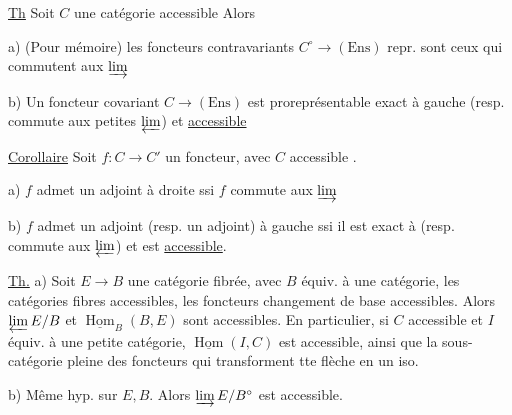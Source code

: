 \uline{Th} Soit $C$ une catégorie accessible   Alors

a) (Pour mémoire) les foncteurs contravariants $C^\circ\to(\mathrm{Ens})$ repr. sont ceux qui commutent aux  $\varinjlim$\deleted{\unsure{---}}


b) Un foncteur covariant  $C\to(\mathrm{Ens})$ est proreprésentable    exact à gauche (resp. commute aux petites $\varprojlim$) et \uline{accessible}

\uline{Corollaire} Soit $f:C\to C'$ un foncteur, avec $C$ accessible .

a) $f$ admet un adjoint à droite ssi $f$ commute aux  $\varinjlim$

b) $f$ admet un adjoint  (resp. un adjoint) à gauche ssi il est exact à  (resp. commute aux  $\varprojlim$)  et est \uline{accessible}.

\uline{Th.} a) Soit $E\to B$ une catégorie fibrée, avec $B$ équiv. à une   catégorie, les catégories fibres accessibles, les foncteurs changement de base accessibles. Alors $\varprojlim E/B$ et $\underline{\operatorname{Hom}}_B(B,E)$ sont accessibles. En particulier, si $C$ accessible et $I$ équiv. à une petite catégorie, $\underline{\operatorname{Hom}}(I,C)$ est accessible, ainsi que la sous-catégorie pleine des foncteurs qui transforment tte flèche en un iso.


b) Même hyp. sur $E,B$. Alors $\varinjlim E/B^\circ$ est accessible.
